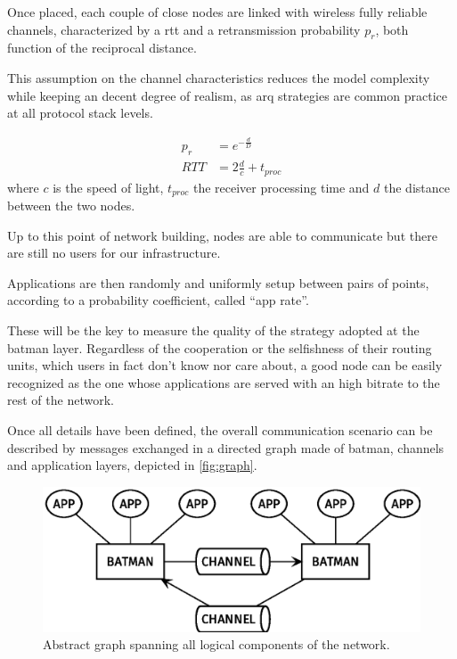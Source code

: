 \documentclass[conference]{IEEEtran}
\begin{document}
Once placed, each couple of close nodes are linked with wireless fully reliable channels, characterized by a \gls{rtt} and a retransmission probability $p_r$, both function of the reciprocal distance.

This assumption on the channel characteristics reduces the model complexity while keeping an decent degree of realism, as \gls{arq} strategies are common practice at all protocol stack levels.

\begin{equation}
  \begin{split}
    p_r & = e^{-\frac{d}{D}} \\
    RTT &= 2 \frac{d}{c} + t_{proc}
  \end{split}
\end{equation}
where $c$ is the speed of light, $t_{proc}$ the receiver processing time and $d$ the distance between the two nodes.
\smallskip

Up to this point of network building, nodes are able to communicate but there are still no users for our infrastructure.

Applications are then randomly and uniformly setup between pairs of points, according to a probability coefficient, called ``app rate''.

These will be the key to measure the quality of the strategy adopted at the \gls{batman} layer.
Regardless of the cooperation or the selfishness of their routing units, which users in fact don't know nor care about, a good node can be easily recognized as the one whose applications are served with an high bitrate to the rest of the network.

\smallskip
Once all details have been defined, the overall communication scenario can be described by messages exchanged in a directed graph made of \gls{batman}, channels and application layers, depicted in \autoref{fig:graph}.

\begin{figure}[h]
  \centering
  \includegraphics[width=\linewidth]{figures/layers_diagram}
  \caption{Abstract graph spanning all logical components of the network.}
  \label{fig:graph}
\end{figure}
\end{document}

